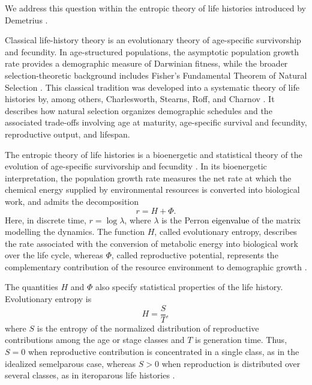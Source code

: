 \documentclass[11pt,a4paper]{amsart}
\begin{document}
We address this question within the entropic theory of life histories
introduced by Demetrius
\cite{Demetrius1974,Demetrius1977}.

\begingroup
\color{black}
Classical life-history theory is an evolutionary theory of age-specific
survivorship and fecundity. In age-structured populations, the asymptotic
population growth rate provides a demographic measure of Darwinian fitness,
while the broader selection-theoretic background includes Fisher's
Fundamental Theorem of Natural Selection \cite{Fisher1930}. This classical
tradition was developed into a systematic theory of life histories by, among
others, Charlesworth, Stearns, Roff, and Charnov
\cite{Charlesworth,Stearns1992,Roff1992,Charnov1993}. It describes how
natural selection organizes demographic schedules and the associated
trade-offs involving age at maturity, age-specific survival and fecundity,
reproductive output, and lifespan.

The entropic theory of life histories is a
bioenergetic and statistical theory of the evolution of age-specific
survivorship and fecundity
\cite{Demetrius1974,Demetrius1977,Demetrius97,Demetrius2000}. In its
bioenergetic interpretation, the population growth rate measures the net rate
at which the chemical energy supplied by environmental resources is converted
into biological work, and admits the decomposition
\begin{equation}
\label{eq:entropy-decomposition}
r=H+\Phi.
\end{equation}
Here, in discrete time, $r=\log\lambda$, where $\lambda$ is the Perron \textcolor{black}{eigenvalue} of the matrix modelling the dynamics. The function $H$, called
evolutionary entropy, describes the rate associated with the conversion of
metabolic energy into biological work over the life cycle, whereas $\Phi$,
called reproductive potential, represents the complementary contribution of
the resource environment to demographic growth
\cite{Demetrius97,Demetrius2000,Demetrius09,
DemetriusLegendreHarremoes2009,Demetrius2023SelfOrganization}.

The quantities $H$ and $\Phi$ also specify statistical properties of the life
history. Evolutionary entropy is
\[
H=\frac{S}{T},
\]
where $S$ is the entropy of the normalized distribution of reproductive
contributions among the age or stage classes and $T$ is generation time.
Thus, $S=0$ when reproductive contribution is concentrated in a single class,
as in the idealized semelparous case, whereas $S>0$ when reproduction is
distributed over several classes, as in iteroparous life histories
\cite{Demetrius1974,Demetrius1977,Demetrius97,Demetrius2000}.
\end{document}
